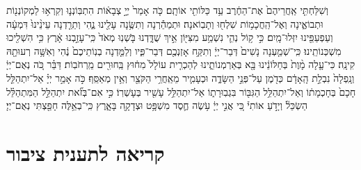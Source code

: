 \documentclass[twoside, openany, parskip=half, 11pt]{book}
\begin{document}
\begin{footnotesize}
\begin{multicols}{2}
וְשִׁלַּחְתִּ֤י אַֽחֲרֵיהֶם֙ אֶת־הַחֶ֔רֶב עַ֥ד כַּלּוֹתִ֖י אוֹתָֽם׃ כֹּ֤ה אָמַר֙ יְיָ֣ צְבָא֔וֹת הִתְבּֽוֹנְנ֛וּ וְקִרְא֥וּ לַמְקוֹנְנ֖וֹת וּתְבוֹאֶ֑ינָה וְאֶל־הַֽחֲכָמ֥וֹת שִׁלְח֖וּ וְתָבֽוֹאנָה׃ וּתְמַהֵ֕רְנָה וְתִשֶּׂ֥נָה עָלֵ֖ינוּ נֶ֑הִי וְתֵרַ֤דְנָה עֵינֵ֨ינוּ֙ דִּמְעָ֔ה וְעַפְעַפֵּ֖ינוּ יִזְּלוּ־מָֽיִם׃ כִּ֣י ק֥וֹל נְהִ֛י נִשְׁמַ֥ע מִצִּיּ֖וֹן אֵ֣יךְ שֻׁדָּ֑דְנוּ בֹּ֤שְׁנֽוּ מְאֹד֙ כִּֽי־עָזַ֣בְנוּ אָ֔רֶץ כִּ֥י הִשְׁלִ֖יכוּ מִשְׁכְּנוֹתֵֽינוּ׃ כִּֽי־שְׁמַ֤עְנָה נָשִׁים֙ דְּבַר־יְיָ֔ וְתִקַּ֥ח אָזְנְכֶ֖ם דְּבַר־פִּ֑יו וְלַמֵּ֤דְנָה בְנֽוֹתֵיכֶם֙ נֶ֔הִי וְאִשָּׁ֥ה רְעוּתָ֖הּ קִינָֽה׃ כִּי־עָ֤לָה מָ֨וֶת֙ בְּחַלּוֹנֵ֔ינוּ בָּ֖א בְּאַרְמְנוֹתֵ֑ינוּ לְהַכְרִ֤ית עוֹלָל֙ מִח֔וּץ בַּֽחוּרִ֖ים מֵֽרְחֹבֽוֹת׃ דַּבֵּ֗ר כֹּ֚ה נְאֻם־יְיָ֔ וְנָֽפְלָה֙ נִבְלַ֣ת הָֽאָדָ֔ם כְּדֹ֖מֶן עַל־פְּנֵ֣י הַשָּׂדֶ֑ה וּכְעָמִ֛יר מֵאַֽחֲרֵ֥י הַקֹּצֵ֖ר וְאֵ֥ין מְאַסֵּֽף׃ כֹּ֣ה אָמַ֣ר יְיָ֗ אַל־יִתְהַלֵּ֤ל חָכָם֙ בְּחָכְמָת֔וֹ וְאַל־יִתְהַלֵּ֥ל הַגִּבּ֖וֹר בִּגְבֽוּרָת֑וֹ אַל־יִתְהַלֵּ֥ל עָשִׁ֖יר בְּעָשְׁרֽוֹ׃ כִּ֣י אִם־בְּזֹ֞את יִתְהַלֵּ֣ל הַמִּתְהַלֵּ֗ל הַשְׂכֵּל֘ וְיָדֹ֣עַ אוֹתִי֒ כִּ֚י אֲנִ֣י יְיָ֔ עֹ֥שֶׂה חֶ֛סֶד מִשְׁפָּ֥ט וּצְדָקָ֖ה בָּאָ֑רֶץ כִּֽי־בְאֵ֥לֶּה חָפַ֖צְתִּי נְאֻם־יְיָ׃

\end{multicols}

\section[תענית ציבור]{קריאה לתענית ציבור}\label{torah taanis tzibbur}
 

\end{footnotesize}
\end{document}
